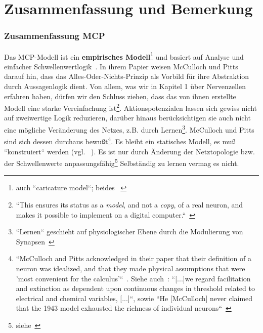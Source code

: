 \chapter{Zusammenfassung und Bemerkung}



\subsection{Zusammenfassung MCP}\label{mcp-summary}

Das MCP-Modell ist ein \textbf{empirisches Modell}\footnote{
    auch ``caricature model``; beides ~\cite[4]{HI97}
} und basiert auf Analyse und einfacher Schwellenwertlogik~\cite[16]{AR88}.
In ihrem Papier weisen McCulloch und Pitts darauf hin, dass das Alles-Oder-Nichts-Prinzip als Vorbild für ihre Abstraktion durch Aussagenlogik dient.
Von allem, was wir in Kapitel 1 über Nervenzellen erfahren haben, dürfen wir den Schluss ziehen, dass das von ihnen erstellte Modell eine starke Vereinfachung ist\footnote{
    ``This ensures its status as a \textit{model}, and not a \textit{copy}, of a real neuron, and makes it possible to implement on a digital computer.``~\cite[43, Hervorhebungen i. O.]{BJ90}
}.
Aktionspotenzialen lassen sich gewiss nicht auf zweiwertige Logik reduzieren, darüber hinaus berücksichtigen sie auch nicht eine mögliche Veränderung des Netzes, z.B. durch Lernen\footnote{
    ``Lernen`` geschieht auf physiologischer Ebene durch die Modulierung von Synapsen~\cite[115]{HS19c}
}.
McCulloch und Pitts sind sich dessen durchaus bewußt\footnote{
    ``McCulloch and Pitts acknowledged in their paper that their definition of a neuron was idealized, and that they made physical assumptions that were 'most convenient for the calculus'``~\cite[21]{Abr02}. Siehe auch~\cite[101]{MP43}: ``[...]we regard facilitation and extinction as dependent upon continuous changes in threshold related to electrical and chemical variables, [...]``, sowie ``He {[McCulloch]} never claimed that the 1943 model exhausted the richness of individual neurons``~\cite[11]{Arb19}
}.
Es bleibt ein statisches Modell, es muß ``konstruiert`` werden (vgl. ~\cite[28]{Fau94}).
Es ist nur durch Änderung der Netztopologie bzw. der Schwellenwerte anpassungsfähig\footnote{siehe~\cite[51]{Roj93}} Selbständig zu lernen vermag es nicht.\\


